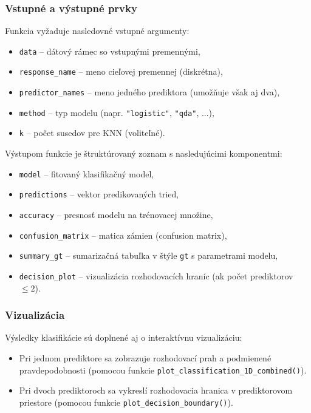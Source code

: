 \subsubsection{Vstupné a výstupné prvky}

Funkcia vyžaduje nasledovné vstupné argumenty:

\begin{itemize}
  \item \texttt{data} – dátový rámec so vstupnými premennými,
  \item \texttt{response\_name} – meno cieľovej premennej (diskrétna),
  \item \texttt{predictor\_names} – meno jedného prediktora (umožňuje však aj dva),
  \item \texttt{method} – typ modelu (napr. \texttt{"logistic"}, \texttt{"qda"}, ...),
  \item \texttt{k} – počet susedov pre KNN (voliteľné).
\end{itemize}

Výstupom funkcie je štruktúrovaný zoznam s nasledujúcimi komponentmi:

\begin{itemize}
  \item \texttt{model} – fitovaný klasifikačný model,
  \item \texttt{predictions} – vektor predikovaných tried,
  \item \texttt{accuracy} – presnosť modelu na trénovacej množine,
  \item \texttt{confusion\_matrix} – matica zámien (confusion matrix),
  \item \texttt{summary\_gt} – sumarizačná tabuľka v štýle \texttt{gt} s parametrami modelu,
  \item \texttt{decision\_plot} – vizualizácia rozhodovacích hraníc (ak počet prediktorov $\leq 2$).
\end{itemize}

\subsubsection{Vizualizácia}

Výsledky klasifikácie sú doplnené aj o interaktívnu vizualizáciu:

\begin{itemize}
  \item Pri jednom prediktore sa zobrazuje rozhodovací prah a podmienené pravdepodobnosti (pomocou funkcie \texttt{plot\_classification\_1D\_combined()}).
  \item Pri dvoch prediktoroch sa vykreslí rozhodovacia hranica v prediktorovom priestore (pomocou funkcie \texttt{plot\_decision\_boundary()}).
\end{itemize}

